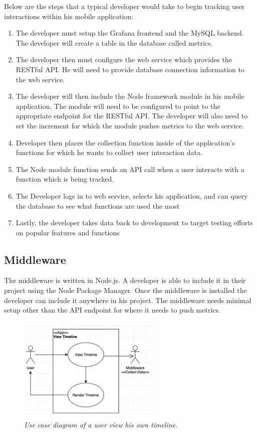 Below are the steps that a typical developer would take to begin tracking user interactions within his mobile application:
\begin{enumerate}
\item The developer must setup the Grafana frontend and the MySQL backend. The developer will create a table in the database called metrics. 
\item The developer then must configure the web service which provides the RESTful API. He will need to provide database connection information to the web service. 
\item The developer will then include the Node framework module in his mobile application. The module will need to be configured to point to the appropriate endpoint for the RESTful API. The developer will also need to set the increment for which the module pushes metrics to the web service. 
\item Developer then places the collection function inside of the application's functions for which he wants to collect user interaction data.
\item The Node module function sends an API call when a user interacts with a function which is being tracked.
\item The Developer logs in to web service, selects his application, and can query the database to see what functions are used the most
\item Lastly, the developer takes data back to development to target testing efforts on popular features and functions
\end{enumerate}

\subsection{Middleware}
The middleware is written in Node.js. A developer is able to include it in their project using the Node Package Manager. Once the middleware is installed the developer can include it anywhere in his project. The middleware needs minimal setup other than the API endpoint for where it needs to push metrics. 

\begin{figure}  
\begin{center}  
\includegraphics[]{view-timeline.png}  
\caption{\small \sl Use case diagram of a user view his own timeline. \label{fig:data_collect_user}}  
\end{center}  
\end{figure}

